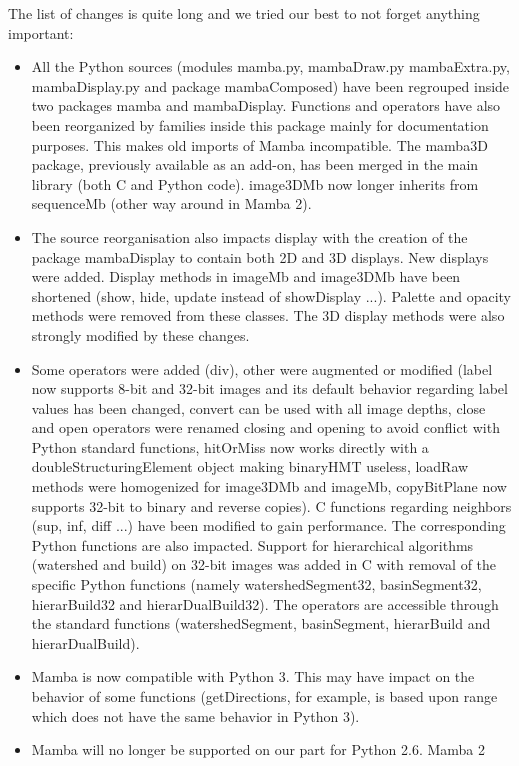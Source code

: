 \documentclass[a4paper,10pt,oneside]{article}
\begin{document}
The list of changes is quite long and we tried our best to not forget
anything important:
\begin{itemize}
\item All the Python sources (modules mamba.py, mambaDraw.py mambaExtra.py,
mambaDisplay.py and package mambaComposed) have been regrouped inside two packages
mamba and mambaDisplay. Functions and operators have also been reorganized
by families inside this package mainly for documentation purposes. This makes old
imports of Mamba incompatible. The mamba3D package, previously available as an
add-on, has been merged in the main library (both C and Python code). image3DMb 
now longer inherits from sequenceMb (other way around in Mamba 2).
\item The source reorganisation also impacts display with the creation of
the package mambaDisplay to contain both 2D and 3D displays. New displays were
added. Display methods in imageMb and image3DMb have been shortened (show,
hide, update instead of showDisplay ...). Palette and opacity methods were
removed from these classes. The 3D display methods were also strongly
modified by these changes.
\item Some operators were added (div), other were augmented or modified 
(label now supports 8-bit and 32-bit images and its default behavior regarding
label values has been changed, convert can be used with all image depths, close
and open operators were renamed closing and opening to avoid conflict with
Python standard functions, hitOrMiss now works directly with a
doubleStructuringElement object making binaryHMT useless, loadRaw methods were
homogenized for image3DMb and imageMb, copyBitPlane now supports 32-bit to
binary and reverse copies). C functions regarding neighbors (sup, inf, diff ...)
have been modified to gain performance. The corresponding Python functions are
also impacted. Support for hierarchical algorithms (watershed and build) on
32-bit images was added in C with removal of the specific Python functions
(namely watershedSegment32, basinSegment32, hierarBuild32 and hierarDualBuild32).
The operators are accessible through the standard functions (watershedSegment,
basinSegment, hierarBuild and hierarDualBuild).
\item Mamba is now compatible with Python 3. This may have impact on the
behavior of some functions (getDirections, for example, is based upon range
which does not have the same behavior in Python 3).
\item Mamba will no longer be supported on our part for Python 2.6. Mamba 2

\end{itemize}
\end{document}
